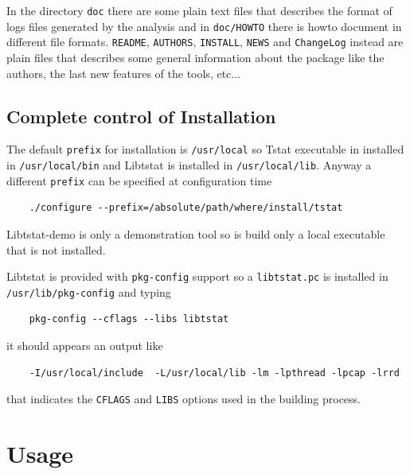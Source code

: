 \documentclass[11pt]{article}
\begin{document}
In the directory \texttt{doc} there are some plain text files that describes the format
of logs files generated by the analysis and in \texttt{doc/HOWTO} there is howto document 
in different file formats.
\texttt{README}, \texttt{AUTHORS}, \texttt{INSTALL}, \texttt{NEWS} and \texttt{ChangeLog} instead are plain files that
describes some general information about the package like the authors, the last new
features of the tools, etc...

\subsection{Complete control of Installation\label{Complete_control_of_Installation}}


The default \texttt{prefix} for installation is \texttt{/usr/local} so
Tstat executable in installed in \texttt{/usr/local/bin} and Libtstat 
is installed in \texttt{/usr/local/lib}. Anyway a different \texttt{prefix} can
be specified at configuration time

\begin{small}\begin{verbatim}
    ./configure --prefix=/absolute/path/where/install/tstat
\end{verbatim}\end{small} \noindent
Libtstat-demo is only a demonstration tool so is build only a local
executable that is not installed.



Libtstat is provided with \texttt{pkg-config} support so a \texttt{libtstat.pc} is installed in
\texttt{/usr/lib/pkg-config} and typing

\begin{small}\begin{verbatim}
    pkg-config --cflags --libs libtstat
\end{verbatim}\end{small} \noindent
it should appears an output like

\begin{small}\begin{verbatim}
    -I/usr/local/include  -L/usr/local/lib -lm -lpthread -lpcap -lrrd
\end{verbatim}\end{small} \noindent
that indicates the \texttt{CFLAGS} and \texttt{LIBS} options used in the building
process.

\section{Usage\label{Usage}}
\end{document}
